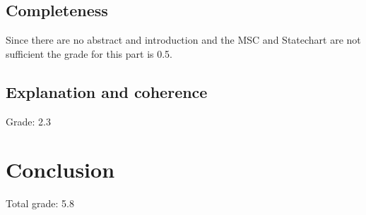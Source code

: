 \documentclass[a4paper,11pt]{article}
\begin{document}
    \subsection{Completeness}
    Since there are no abstract and introduction and the MSC and Statechart are not sufficient the grade for this part is 0.5.\\

    \subsection{Explanation and coherence}
    Grade: 2.3

    \section{Conclusion}
    Total grade: 5.8
\end{document}

